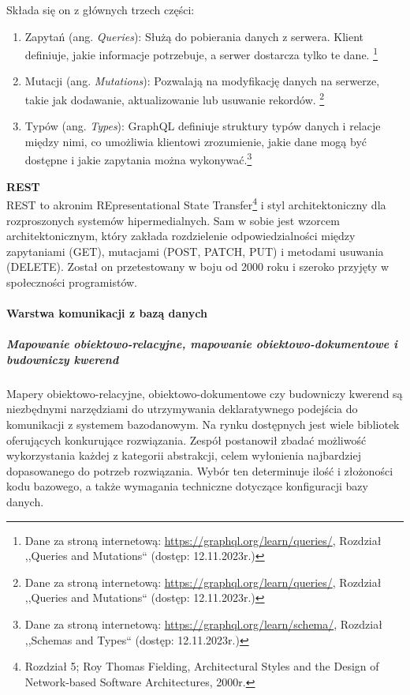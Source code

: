\documentclass[12pt, a4paper, twoside, openany]{book}
\newcommand{\forceindent}{\leavevmode{\parindent=1.3em\indent}}
\begin{document}
Składa się on z głównych trzech części:
\begin{enumerate}
    \item Zapytań (ang. \textit{Queries}): Służą do pobierania danych z serwera. Klient definiuje, jakie informacje potrzebuje, a serwer dostarcza tylko te dane. \footnote{Dane za stroną internetową: \url{https://graphql.org/learn/queries/}, Rozdział ,,Queries and Mutations`` (dostęp: 12.11.2023r.)}
    \item Mutacji (ang. \textit{Mutations}): Pozwalają na modyfikację danych na serwerze, takie jak dodawanie, aktualizowanie lub usuwanie rekordów. \footnote{Dane za stroną internetową: \url{https://graphql.org/learn/queries/}, Rozdział ,,Queries and Mutations`` (dostęp: 12.11.2023r.)}
    \item Typów (ang. \textit{Types}): GraphQL definiuje struktury typów danych i relacje między nimi, co umożliwia klientowi zrozumienie, jakie dane mogą być dostępne i jakie zapytania można wykonywać.\footnote{Dane za stroną internetową: \url{https://graphql.org/learn/schema/}, Rozdział ,,Schemas and Types`` (dostęp: 12.11.2023r.)}
\end{enumerate}

\textbf{REST}\\
\forceindent REST to akronim REpresentational State Transfer\footnote{Rozdział 5; Roy Thomas Fielding, Architectural Styles and the Design of Network-based Software Architectures, 2000r.} i styl architektoniczny dla rozproszonych systemów hipermedialnych. Sam w sobie jest wzorcem architektonicznym, który zakłada rozdzielenie odpowiedzialności między zapytaniami (GET), mutacjami (POST, PATCH, PUT) i metodami usuwania (DELETE). Został on przetestowany w boju od 2000 roku i szeroko przyjęty w społeczności programistów.

\paragraph{Warstwa komunikacji z bazą danych}
\subparagraph{Mapowanie obiektowo-relacyjne, mapowanie obiektowo-dokumentowe i budowniczy kwerend\\}
\forceindent  Mapery obiektowo-relacyjne, obiektowo-dokumentowe czy budowniczy kwerend są niezbędnymi narzędziami do utrzymywania deklaratywnego podejścia do komunikacji z systemem bazodanowym.
Na rynku dostępnych jest wiele bibliotek oferujących konkurujące rozwiązania.
Zespół postanowił zbadać możliwość wykorzystania każdej z kategorii abstrakcji, celem wyłonienia najbardziej dopasowanego do potrzeb rozwiązania.
Wybór ten determinuje ilość i złożoności kodu bazowego, a także wymagania techniczne dotyczące konfiguracji bazy danych.
\end{document}
